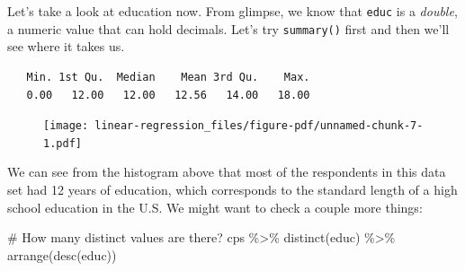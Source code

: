 \documentclass[
  letterpaper,
]{book}
\newenvironment{Shaded}{\begin{snugshade}}{\end{snugshade}}
\newcommand{\AttributeTok}[1]{\textcolor[rgb]{0.40,0.45,0.13}{#1}}
\newcommand{\CommentTok}[1]{\textcolor[rgb]{0.37,0.37,0.37}{#1}}
\newcommand{\DecValTok}[1]{\textcolor[rgb]{0.68,0.00,0.00}{#1}}
\newcommand{\FunctionTok}[1]{\textcolor[rgb]{0.28,0.35,0.67}{#1}}
\newcommand{\NormalTok}[1]{\textcolor[rgb]{0.00,0.23,0.31}{#1}}
\newcommand{\SpecialCharTok}[1]{\textcolor[rgb]{0.37,0.37,0.37}{#1}}
\begin{document}
Let's take a look at education now. From glimpse, we know that
\texttt{educ} is a \emph{double}, a numeric value that can hold
decimals. Let's try \texttt{summary()} first and then we'll see where it
takes us.

\begin{Shaded}
\end{Shaded}

\begin{verbatim}
   Min. 1st Qu.  Median    Mean 3rd Qu.    Max. 
   0.00   12.00   12.00   12.56   14.00   18.00 
\end{verbatim}

\begin{Shaded}
\end{Shaded}

\begin{figure}[H]

{\centering \texttt{[image: linear-regression\_files/figure-pdf/unnamed-chunk-7-1.pdf]}

}

\end{figure}

We can see from the histogram above that most of the respondents in this
data set had 12 years of education, which corresponds to the standard
length of a high school education in the U.S. We might want to check a
couple more things:

\begin{Shaded}
\begin{Highlighting}[]
\CommentTok{\# How many distinct values are there?}
\NormalTok{cps }\SpecialCharTok{\%\textgreater{}\%}
  \FunctionTok{distinct}\NormalTok{(educ) }\SpecialCharTok{\%\textgreater{}\%}
  \FunctionTok{arrange}\NormalTok{(}\FunctionTok{desc}\NormalTok{(educ))}
\end{Highlighting}
\end{Shaded}
\end{document}
